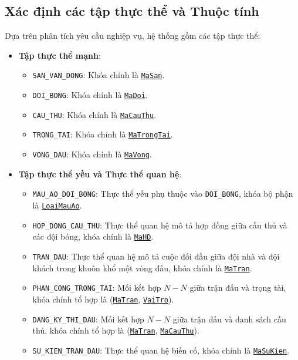 \subsection{Xác định các tập thực thể và Thuộc tính}
Dựa trên phân tích yêu cầu nghiệp vụ, hệ thống gồm các tập thực thể:
\begin{itemize}
    \item \textbf{Tập thực thể mạnh}:
    \begin{itemize}
        \item \texttt{SAN\_VAN\_DONG}: Khóa chính là \underline{\texttt{MaSan}}.
        \item \texttt{DOI\_BONG}: Khóa chính là \underline{\texttt{MaDoi}}.
        \item \texttt{CAU\_THU}: Khóa chính là \underline{\texttt{MaCauThu}}.
        \item \texttt{TRONG\_TAI}: Khóa chính là \underline{\texttt{MaTrongTai}}.
        \item \texttt{VONG\_DAU}: Khóa chính là \underline{\texttt{MaVong}}.
    \end{itemize}
    \item \textbf{Tập thực thể yếu và Thực thể quan hệ}:
    \begin{itemize}
        \item \texttt{MAU\_AO\_DOI\_BONG}: Thực thể yếu phụ thuộc vào \texttt{DOI\_BONG}, khóa bộ phận là \underline{\texttt{LoaiMauAo}}.
        \item \texttt{HOP\_DONG\_CAU\_THU}: Thực thể quan hệ mô tả hợp đồng giữa cầu thủ và các đội bóng, khóa chính là \underline{\texttt{MaHD}}.
        \item \texttt{TRAN\_DAU}: Thực thể quan hệ mô tả cuộc đối đầu giữa đội nhà và đội khách trong khuôn khổ một vòng đấu, khóa chính là \underline{\texttt{MaTran}}.
        \item \texttt{PHAN\_CONG\_TRONG\_TAI}: Mối kết hợp $N-N$ giữa trận đấu và trọng tài, khóa chính tổ hợp là (\underline{\texttt{MaTran}}, \underline{\texttt{VaiTro}}).
        \item \texttt{DANG\_KY\_THI\_DAU}: Mối kết hợp $N-N$ giữa trận đấu và danh sách cầu thủ, khóa chính tổ hợp là (\underline{\texttt{MaTran}}, \underline{\texttt{MaCauThu}}).
        \item \texttt{SU\_KIEN\_TRAN\_DAU}: Thực thể quan hệ biến cố, khóa chính là \underline{\texttt{MaSuKien}}.
    \end{itemize}
\end{itemize}

